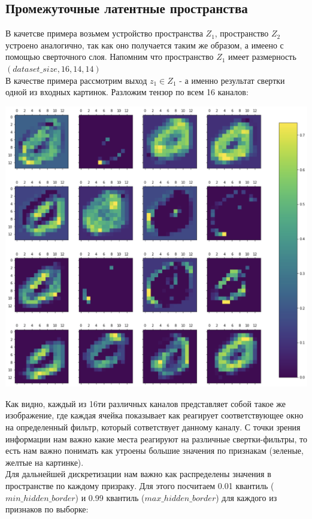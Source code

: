 \subsection{Промежуточные латентные пространства}
В качетсве примера возьмем устройство пространства $Z_1$, пространство $Z_2$ устроено аналогично, так как оно получается таким же образом, а имеено с помощью сверточного слоя. Напомним что пространство $Z_1$ имеет размерность $(dataset\_size, 16, 14, 14)$ \\
В качестве примера рассмотрим выход $z_1 \in Z_1$ - а именно результат свертки одной из входных картинок. Разложим тензор по всем 16 каналов: 
\begin{center}
    \includegraphics[scale=0.5]{images/plt_z1.png}
\end{center}
Как видно, каждый из 16ти различных каналов представляет собой такое же изображение, где каждая ячейка показывает как реагирует соответствующее окно на определенный фильтр, который сответствует данному каналу. С точки зрения информации нам важно какие места реагируют на различные свертки-фильтры, то есть нам важно понимать как утроены большие значения по признакам (зеленые, желтые на картинке). \\
Для дальнейшей дискретизации нам важно как распределены значения в пространстве по каждому призраку. Для этого посчитаем 0.01 квантиль ($min\_hidden\_border$) и 0.99 квантиль ($max\_hidden\_border$) для каждого из признаков по выборке:
